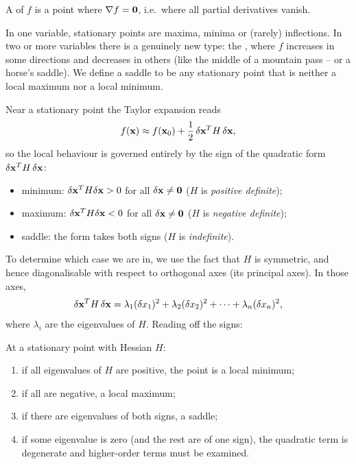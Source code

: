 \documentclass[a4paper]{scrartcl}
\begin{document}
\begin{definition}
	A  of $f$ is a point where $\nabla f = \mathbf{0}$, i.e.\ where all partial derivatives vanish.
\end{definition}

In one variable, stationary points are maxima, minima or (rarely) inflections. In two or more variables there is a genuinely new type: the , where $f$ increases in some directions and decreases in others (like the middle of a mountain pass -- or a horse's saddle). We define a saddle to be any stationary point that is neither a local maximum nor a local minimum.

Near a stationary point the Taylor expansion reads
$$
f(\mathbf{x}) \approx f(\mathbf{x}_0) + \frac{1}{2}\, \delta \mathbf{x}^T H \, \delta \mathbf{x},
$$
so the local behaviour is governed entirely by the sign of the quadratic form $\delta \mathbf{x}^T H \, \delta \mathbf{x}$:
\begin{itemize}
	\item minimum: $\delta \mathbf{x}^T H \delta \mathbf{x} > 0$ for all $\delta \mathbf{x} \neq \mathbf{0}$ ($H$ is \emph{positive definite});
	\item maximum: $\delta \mathbf{x}^T H \delta \mathbf{x} < 0$ for all $\delta \mathbf{x} \neq \mathbf{0}$ ($H$ is \emph{negative definite});
	\item saddle: the form takes both signs ($H$ is \emph{indefinite}).
\end{itemize}
To determine which case we are in, we use the fact that $H$ is symmetric, and hence diagonalisable with respect to orthogonal axes (its principal axes). In those axes,
$$
\delta \mathbf{x}^T H \, \delta \mathbf{x} = \lambda_1 (\delta x_1)^2 + \lambda_2 (\delta x_2)^2 + \cdots + \lambda_n (\delta x_n)^2,
$$
where $\lambda_i$ are the eigenvalues of $H$. Reading off the signs:

\begin{proposition}
	At a stationary point with Hessian $H$:
	\begin{enumerate}[label=(\roman*)]
		\item if all eigenvalues of $H$ are positive, the point is a local minimum;
		\item if all are negative, a local maximum;
		\item if there are eigenvalues of both signs, a saddle;
		\item if some eigenvalue is zero (and the rest are of one sign), the quadratic term is degenerate and higher-order terms must be examined.
	\end{enumerate}
\end{proposition}
\end{document}
